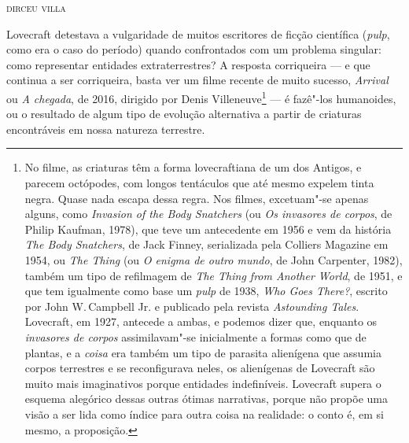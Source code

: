 \baselineskip


\begin{flushright}
\textsc{dirceu villa}
\end{flushright}


\noindent{}Lovecraft detestava a vulgaridade de muitos escritores de ficção
científica (\textit{pulp}, como era o caso do período) quando confrontados
com um problema singular: como representar entidades extraterrestres? A
resposta corriqueira --- e que continua a ser corriqueira, basta ver um
filme recente de muito sucesso, \textit{Arrival} ou \textit{A chegada}, de 2016,
dirigido por Denis Villeneuve\footnote{No filme, as criaturas têm a forma lovecraftiana de um dos Antigos, e parecem octópodes, com longos tentáculos que até mesmo expelem tinta negra. Quase nada escapa dessa regra. Nos filmes, excetuam"-se apenas alguns, como \textit{Invasion of the Body Snatchers} (ou \textit{Os invasores de corpos}, de Philip Kaufman, 1978), que teve um antecedente em 1956 e vem da história \textit{The Body Snatchers}, de Jack Finney, serializada pela Colliers Magazine em 1954, ou \textit{The Thing} (ou \textit{O enigma de outro mundo}, de John Carpenter, 1982), também um tipo de refilmagem de \textit{The Thing from Another World}, de 1951, e que tem igualmente como base um \textit{pulp} de 1938, \textit{Who Goes There?}, escrito por John W.\,Campbell Jr. e publicado pela revista \textit{Astounding Tales}. Lovecraft, em 1927, antecede a ambas, e podemos dizer que, enquanto os \textit{invasores de corpos} assimilavam"-se inicialmente a formas como que de plantas, e a \textit{coisa} era também um tipo de parasita alienígena que assumia corpos terrestres e se reconfigurava neles, os alienígenas de Lovecraft são muito mais imaginativos porque entidades indefiníveis. Lovecraft supera o esquema alegórico dessas outras ótimas narrativas, porque não propõe uma visão a ser lida como índice para outra coisa na realidade: o conto é, em si mesmo, a proposição.} --- é fazê"-los
humanoides, ou o resultado de algum tipo de evolução alternativa a
partir de criaturas encontráveis em nossa natureza terrestre.

